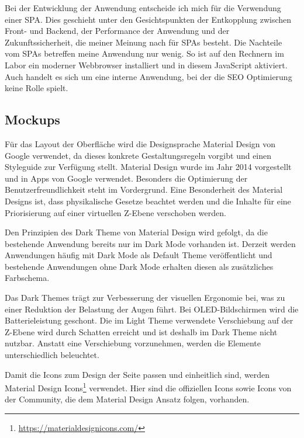 Bei der Entwicklung der Anwendung entscheide ich mich für die Verwendung einer SPA. Dies geschieht unter den Gesichtspunkten der Entkopplung zwischen Front- und Backend, der Performance der Anwendung und der Zukunftssicherheit, die meiner Meinung nach für SPAs besteht. Die Nachteile vom SPAs betreffen meine Anwendung nur wenig. So ist auf den Rechnern im Labor ein moderner Webbrowser installiert und in diesem JavaScript aktiviert. Auch handelt es sich um eine interne Anwendung, bei der die SEO Optimierung keine Rolle spielt. \cite{melnikSinglePageApplication2020}

\subsection{Mockups} \label{subsec:Mockup}

Für das Layout der Oberfläche wird die Designsprache Material Design von Google verwendet, da dieses konkrete Gestaltungsregeln vorgibt und einen Styleguide zur Verfügung stellt. Material Design wurde im Jahr 2014 vorgestellt und in Apps von Google verwendet. Besonders die Optimierung der Benutzerfreundlichkeit steht im Vordergrund. Eine Besonderheit des Material Designs ist, dass physikalische Gesetze beachtet werden und die Inhalte für eine Priorisierung auf einer virtuellen Z-Ebene verschoben werden. \cite{kulturbanause-teamMaterialDesignDesignsprache2017}

Den Prinzipien des Dark Theme von Material Design wird gefolgt, da die bestehende Anwendung bereits nur im Dark Mode vorhanden ist. Derzeit werden Anwendungen häufig mit Dark Mode als Default Theme veröffentlicht und bestehende Anwendungen ohne Dark Mode erhalten diesen als zusätzliches Farbschema. \cite{colbyWindows10Dark2020}

Das Dark Themes trägt zur Verbesserung der visuellen Ergonomie bei, was zu einer Reduktion der Belastung der Augen führt. Bei OLED-Bildschirmen wird die Batterieleistung geschont. Die im Light Theme verwendete Verschiebung auf der Z-Ebene wird durch Schatten erreicht und ist deshalb im Dark Theme nicht nutzbar. Anstatt eine Verschiebung vorzunehmen, werden die Elemente unterschiedlich beleuchtet.\cite{googleDarkTheme}

Damit die Icons zum Design der Seite passen und einheitlich sind, werden Material Design Icons\footnote{\url{https://materialdesignicons.com/}} verwendet. Hier sind die offiziellen Icons sowie Icons von der Community, die dem Material Design Ansatz folgen, vorhanden.

